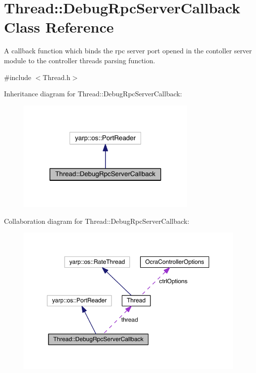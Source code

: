 \hypertarget{classThread_1_1DebugRpcServerCallback}{}\section{Thread\+:\+:Debug\+Rpc\+Server\+Callback Class Reference}
\label{classThread_1_1DebugRpcServerCallback}


A callback function which binds the rpc server port opened in the contoller server module to the controller thread\textquotesingle{}s parsing function.  




{\ttfamily \#include $<$Thread.\+h$>$}



Inheritance diagram for Thread\+:\+:Debug\+Rpc\+Server\+Callback\+:\nopagebreak
\begin{figure}[H]
\begin{center}
\leavevmode
\includegraphics[width=248pt]{classThread_1_1DebugRpcServerCallback__inherit__graph}
\end{center}
\end{figure}


Collaboration diagram for Thread\+:\+:Debug\+Rpc\+Server\+Callback\+:\nopagebreak
\begin{figure}[H]
\begin{center}
\leavevmode
\includegraphics[width=350pt]{classThread_1_1DebugRpcServerCallback__coll__graph}
\end{center}
\end{figure}
